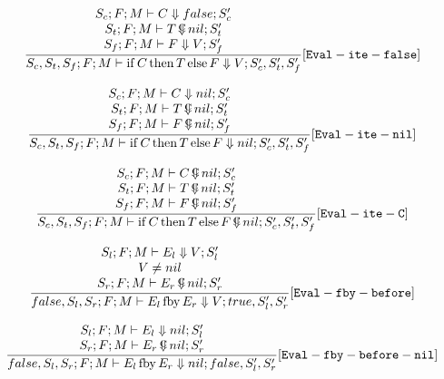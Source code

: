 \documentclass{scrartcl}
\DeclareMathOperator{\ifop}{if}
\DeclareMathOperator{\thenop}{then}
\DeclareMathOperator{\elseop}{else}
\DeclareMathOperator{\fby}{fby}
\DeclareMathOperator{\ceval}{\overset{C}{\smash{\Downarrow}}}
\begin{document}
    \begin{align*}
    \frac{
        \begin{matrix}
        S_c; F; M \vdash C \Downarrow false; S_c' \\
        S_t; F; M \vdash T  \ceval nil; S_t' \\
        S_f; F; M \vdash F \Downarrow V; S_f'
        \end{matrix}
    }{
        S_c, S_t, S_f; F; M \vdash \ifop C \thenop T \elseop F \Downarrow V; S_c', S_t', S_f'
    }[\mathtt{Eval-ite-false}]
    \end{align*}
    
    \begin{align*}
    \frac{
        \begin{matrix}
        S_c; F; M \vdash C \Downarrow nil; S_c' \\
        S_t; F; M \vdash T  \ceval nil; S_t' \\
        S_f; F; M \vdash F  \ceval nil; S_f'
        \end{matrix}
    }{
        S_c, S_t, S_f; F; M \vdash \ifop C \thenop T \elseop F \Downarrow nil; S_c', S_t', S_f'
    }[\mathtt{Eval-ite-nil}]
    \end{align*}
    
    \begin{align*}
    \frac{
        \begin{matrix}
        S_c; F; M \vdash C  \ceval nil; S_c' \\
        S_t; F; M \vdash T  \ceval nil; S_t' \\
        S_f; F; M \vdash F  \ceval nil; S_f'
        \end{matrix}
    }{
        S_c, S_t, S_f; F; M \vdash \ifop C \thenop T \elseop F  \ceval nil; S_c', S_t', S_f'
    }[\mathtt{Eval-ite-C}]
    \end{align*}
    
    \begin{align*}
    \frac{
        \begin{matrix}
        S_l; F; M \vdash E_l \Downarrow V; S_l' \\
        V \neq nil \\
        S_r; F; M \vdash E_r  \ceval nil; S_r'
        \end{matrix}
    }{
        false, S_l, S_r; F; M \vdash E_l \fby E_r \Downarrow V; true, S_l', S_r'
    }[\mathtt{Eval-fby-before}]
    \end{align*}
    
    \begin{align*}
    \frac{
        \begin{matrix}
        S_l; F; M \vdash E_l \Downarrow nil; S_l' \\
        S_r; F; M \vdash E_r  \ceval nil; S_r'
        \end{matrix}
    }{
        false, S_l, S_r; F; M \vdash E_l \fby E_r \Downarrow nil; false, S_l', S_r'
    }[\mathtt{Eval-fby-before-nil}]
    \end{align*}
    
\end{document}
